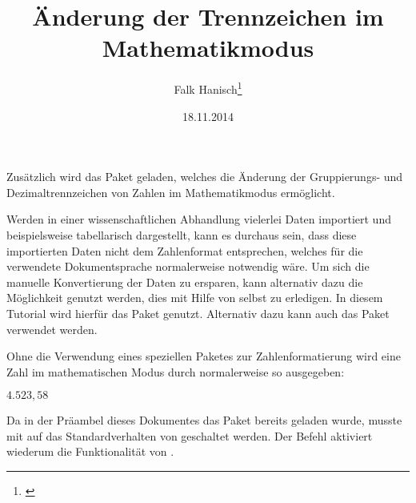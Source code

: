 \documentclass[english,ngerman]{tudscrartcl}
\begin{document}
\title{Änderung der Trennzeichen im Mathematikmodus}
\author{Falk Hanisch\thanks{\noexpand\href{mailto:\tudscrmail}{\tudscrmail}}}
\date{18.11.2014}
\makeatletter
\begingroup%
  \def\and{, }%
  \let\thanks\@gobble%
  \let\footnote\@gobble%
\endgroup%
\markright{\@title}
\makeatother
\StartTutorial
%
%
Zusätzlich wird das Paket  geladen, welches die Änderung der 
Gruppierungs- und Dezimaltrennzeichen von Zahlen im Mathematikmodus ermöglicht.
%
\begin{Preamble}
\usepackage{mathswap}
\end{Preamble}
%
Werden in einer wissenschaftlichen Abhandlung vielerlei Daten importiert und 
beispielsweise tabellarisch dargestellt, kann es durchaus sein, dass diese 
importierten Daten nicht dem Zahlenformat entsprechen, welches für die 
verwendete Dokumentsprache normalerweise notwendig wäre. Um sich die manuelle 
Konvertierung der Daten zu ersparen, kann alternativ dazu die Möglichkeit 
genutzt werden, dies mit Hilfe von  selbst zu erledigen. In 
diesem Tutorial wird hierfür das Paket  genutzt. Alternativ 
dazu kann auch das Paket  verwendet werden.

Ohne die Verwendung eines speziellen Paketes zur Zahlenformatierung wird eine 
Zahl im mathematischen Modus durch  normalerweise so 
ausgegeben: 
%
\begin{Trunk*}
\mathswapoff
\(4.523,58\)
\mathswapon
\end{Trunk*}
%
Da in der Präambel dieses Dokumentes das Paket  bereits 
geladen wurde, musste mit  auf das Standardverhalten von 
 geschaltet werden. Der Befehl  aktiviert 
wiederum die Funktionalität von .
\end{document}
